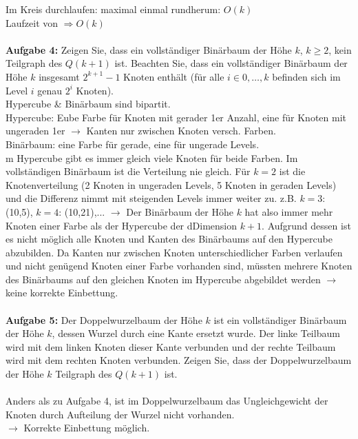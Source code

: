 \documentclass[12pt,a4paper]{report}
\begin{document}
Im Kreis durchlaufen: maximal einmal rundherum: $O(k)$\\
Laufzeit von $\Rightarrow O(k)$\\
\\
\textbf{Aufgabe 4:}
Zeigen Sie, dass ein vollständiger Binärbaum der Höhe $k$, $k \ge 2$, kein Teilgraph des $Q(k + 1)$ ist. Beachten Sie, dass ein vollständiger Binärbaum der Höhe $k$ insgesamt $2^{k+1}-1$ Knoten enthält (für alle $i \in 0,\dots,k$ befinden sich im Level $i$ genau $2^i$ Knoten).
\\
Hypercube \& Binärbaum sind bipartit.\\
Hypercube: Eube Farbe für Knoten mit gerader 1er Anzahl, eine für Knoten mit ungeraden 1er $\rightarrow$ Kanten nur zwischen Knoten versch. Farben.\\
Binärbaum: eine Farbe für gerade, eine für ungerade Levels.\\
m Hypercube gibt es immer gleich viele Knoten für beide Farben.
Im vollständigen Binärbaum ist die Verteilung nie gleich. Für $k=2$ ist die Knotenverteilung (2 Knoten in ungeraden Levels, 5 Knoten in geraden Levels) und die Differenz nimmt mit steigenden Levels immer weiter zu. z.B. $k=3$: (10,5), $k=4$: (10,21),... $\rightarrow$ Der Binärbaum der Höhe $k$ hat also immer mehr Knoten einer Farbe als der Hypercube der dDimension $k+1$. Aufgrund dessen ist es nicht möglich alle Knoten und Kanten des Binärbaums auf den Hypercube abzubilden. Da Kanten nur zwischen Knoten unterschiedlicher Farben verlaufen und nicht genügend Knoten einer Farbe vorhanden sind, müssten mehrere Knoten des Binärbaums auf den gleichen Knoten im Hypercube abgebildet werden $\rightarrow$ keine korrekte Einbettung.\\
\ \\
\textbf{Aufgabe 5:}
Der Doppelwurzelbaum der Höhe $k$ ist ein vollständiger Binärbaum
der Höhe $k$, dessen Wurzel durch eine Kante ersetzt wurde. Der linke
Teilbaum wird mit dem linken Knoten dieser Kante verbunden und der
rechte Teilbaum wird mit dem rechten Knoten verbunden. Zeigen Sie, dass
der Doppelwurzelbaum der Höhe $k$ Teilgraph des $Q(k + 1)$ ist.\\
\\
Anders als zu Aufgabe 4, ist im Doppelwurzelbaum das Ungleichgewicht der Knoten durch Aufteilung der Wurzel nicht vorhanden.\\
$\rightarrow$ Korrekte Einbettung möglich.\\
\begin{center}
	
\end{center}
\end{document}
